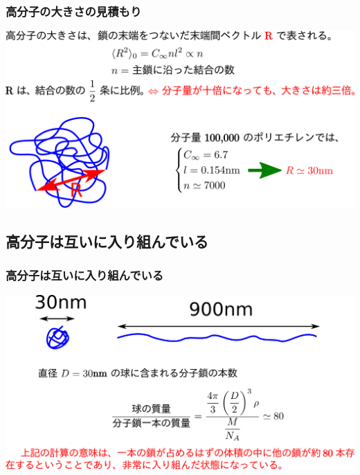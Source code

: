 \documentclass[unicode,12pt]{beamer}%
\begin{document}
\begin{frame}
	\frametitle{高分子の大きさの見積もり}
	\centering
	\includegraphics[width=\textwidth]{polymer_R.png}
\end{frame}

\subsection{高分子は互いに入り組んでいる}
\begin{frame}
	\frametitle{高分子は互いに入り組んでいる}
	\centering
	\includegraphics[width=\textwidth]{polymer_penetrate.png}
\end{frame}
\end{document}
